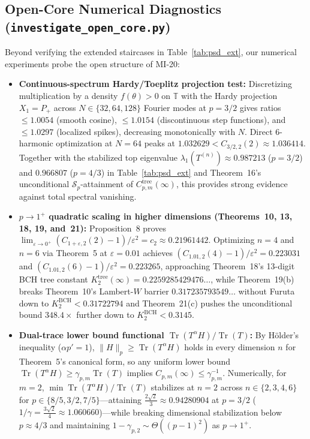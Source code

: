 \documentclass[10pt,letterpaper]{article}
\newcommand{\Sp}{\mathcal{S}_p}
\newcommand{\Tr}{\operatorname{Tr}}
\begin{document}
\subsection{Open-Core Numerical Diagnostics (\texttt{investigate\_open\_core.py})}

Beyond verifying the extended staircases in Table~\ref{tab:psd_ext}, our numerical experiments probe the open structure of MI-20:
\begin{itemize}[leftmargin=1.5em,itemsep=2pt]
  \item \textbf{Continuous-spectrum Hardy/Toeplitz projection test:} Discretizing multiplication by a density $f(\theta) > 0$ on $\mathbb{T}$ with the Hardy projection $X_1 = P_+$ across $N \in \{32, 64, 128\}$ Fourier modes at $p = 3/2$ gives ratios $\le 1.0054$ (smooth cosine), $\le 1.0154$ (discontinuous step functions), and $\le 1.0297$ (localized spikes), decreasing monotonically with $N$. Direct 6-harmonic optimization at $N = 64$ peaks at $1.032629 < C_{3/2,2}(2) \approx 1.036414$. Together with the stabilized top eigenvalue $\lambda_1(T^{(n)}) \approx 0.987213$ ($p = 3/2$) and $0.966807$ ($p = 4/3$) in Table~\ref{tab:psd_ext} and Theorem~16's unconditional $\Sp$-attainment of $C_{p,m}^{\mathrm{tree}}(\infty)$, this provides strong evidence against total spectral vanishing.
  \item \textbf{$p \to 1^+$ quadratic scaling in higher dimensions (Theorems~10, 13, 18, 19, and~21):} Proposition~8 proves $\lim_{\varepsilon\to 0^+}(C_{1+\varepsilon,2}(2)-1)/\varepsilon^2 = c_2 \approx 0.21961442$. Optimizing $n = 4$ and $n = 6$ via Theorem~5 at $\varepsilon = 0.01$ achieves $(C_{1.01,2}(4)-1)/\varepsilon^2 = 0.223031$ and $(C_{1.01,2}(6)-1)/\varepsilon^2 = 0.223265$, approaching Theorem~18's 13-digit BCH tree constant $K_2^{\mathrm{tree}}(\infty) = 0.2259285429476\dots$, while Theorem~19(b) breaks Theorem~10's Lambert-$W$ barrier $0.317235793549\dots$ without Furuta down to $K_2^{\mathrm{BCH}} < 0.31722794$ and Theorem~21(c) pushes the unconditional bound $348.4\times$ further down to $K_2^{\mathrm{BCH}} < 0.3145$.
  \item \textbf{Dual-trace lower bound functional $\Tr(T^\alpha H) / \Tr(T)$:} By H\"older's inequality ($\alpha p' = 1$), $\|H\|_p \ge \Tr(T^\alpha H)$ holds in every dimension $n$ for Theorem~5's canonical form, so any uniform lower bound $\Tr(T^\alpha H) \ge \gamma_{p,m}\Tr(T)$ implies $C_{p,m}(\infty) \le \gamma_{p,m}^{-1}$. Numerically, for $m = 2$, $\min \Tr(T^\alpha H)/\Tr(T)$ stabilizes at $n = 2$ across $n \in \{2, 3, 4, 6\}$ for $p \in \{8/5, 3/2, 7/5\}$—attaining $\frac{2\sqrt{2}}{3} \approx 0.94280904$ at $p = 3/2$ ($1/\gamma = \frac{3\sqrt{2}}{4} \approx 1.060660$)—while breaking dimensional stabilization below $p \approx 4/3$ and maintaining $1 - \gamma_{p,2} \sim \Theta((p-1)^2)$ as $p \to 1^+$.
\end{itemize}
\end{document}
